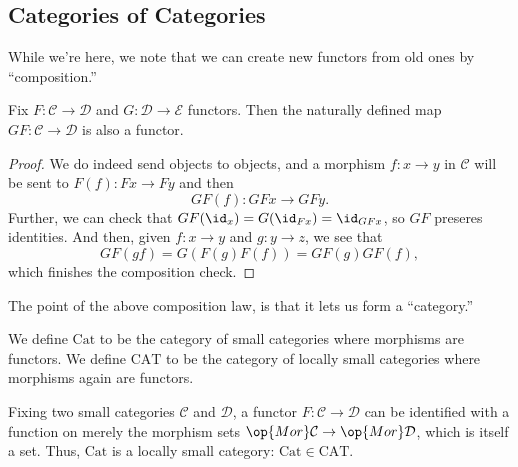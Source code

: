 \subsection{Categories of Categories}
While we're here, we note that we can create new functors from old ones by ``composition.''
\begin{proposition}
	Fix $F:\mathcal C\to\mathcal D$ and $G:\mathcal D\to\mathcal E$ functors. Then the naturally defined map $GF:\mathcal C\to\mathcal D$ is also a functor.
\end{proposition}
\begin{proof}
	We do indeed send objects to objects, and a morphism $f:x\to y$ in $\mathcal C$ will be sent to $F(f):Fx\to Fy$ and then
	\[GF(f):GFx\to GFy.\]
	Further, we can check that $GF(\id_x)=G(\id_{Fx})=\id_{GFx}$, so $GF$ preseres identities. And then, given $f:x\to y$ and $g:y\to z$, we see that
	\[GF(gf)=G(F(g)F(f))=GF(g)GF(f),\]
	which finishes the composition check.
\end{proof}
The point of the above composition law, is that it lets us form a ``category.''
\begin{definition}
	We define $\mathrm{Cat}$ to be the category of small categories where morphisms are functors. We define $\mathrm{CAT}$ to be the category of locally small categories where morphisms again are functors.
\end{definition}
\begin{remark}
	Fixing two small categories $\mathcal C$ and $\mathcal D$, a functor $F:\mathcal C\to\mathcal D$ can be identified with a function on merely the morphism sets $\op{Mor}\mathcal C\to\op{Mor}\mathcal D$, which is itself a set. Thus, $\mathrm{Cat}$ is a locally small category: $\mathrm{Cat}\in\mathrm{CAT}$.
\end{remark}

